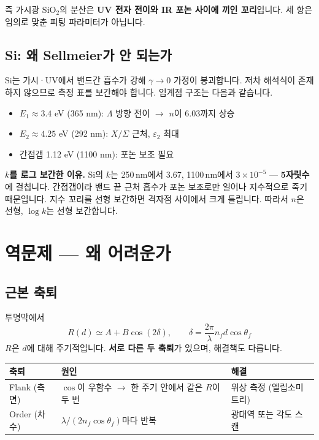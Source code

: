 \documentclass[10pt,a4paper]{article}
\newcommand{\note}[1]{%
  \begin{tcolorbox}[enhanced,breakable,colback=white,colframe=accent,
    boxrule=0pt,leftrule=1.6pt,arc=0pt,outer arc=0pt,
    left=6pt,right=2pt,top=3pt,bottom=3pt,boxsep=0pt,
    before skip=5pt, after skip=8pt]
  #1
  \end{tcolorbox}}
\begin{document}
즉 가시광 SiO$_2$의 분산은 \textbf{UV 전자 전이와 IR 포논 사이에 끼인 꼬리}입니다. 세 항은 임의로 맞춘 피팅 파라미터가 아닙니다.

\subsection{Si: 왜 Sellmeier가 안 되는가}

Si는 가시·UV에서 밴드간 흡수가 강해 $\gamma\to0$ 가정이 붕괴합니다. 저차 해석식이 존재하지 않으므로 측정 표를 보간해야 합니다. 임계점 구조는 다음과 같습니다.

\begin{itemize}[leftmargin=14pt,itemsep=1pt]
\item $E_1\approx3.4$ eV (365 nm): $\Lambda$ 방향 전이 $\to$ $n$이 6.03까지 상승
\item $E_2\approx4.25$ eV (292 nm): $X/\Sigma$ 근처, $\varepsilon_2$ 최대
\item 간접갭 1.12 eV (1100 nm): 포논 보조 필요
\end{itemize}

\note{\textbf{$k$를 로그 보간한 이유.} Si의 $k$는 250\,nm에서 3.67, 1100\,nm에서 $3\times10^{-5}$ — \textbf{5자릿수}에 걸칩니다. 간접갭이라 밴드 끝 근처 흡수가 포논 보조로만 일어나 지수적으로 죽기 때문입니다. 지수 꼬리를 선형 보간하면 격자점 사이에서 크게 틀립니다. 따라서 $n$은 선형, $\log k$는 선형 보간합니다.}

\section{역문제 — 왜 어려운가}

\subsection{근본 축퇴}

투명막에서
\begin{equation}
R(d)\simeq A+B\cos(2\delta),\qquad \delta=\frac{2\pi}{\lambda}n_f d\cos\theta_f
\end{equation}
$R$은 $d$에 대해 주기적입니다. \textbf{서로 다른 두 축퇴}가 있으며, 해결책도 다릅니다.

\begin{center}
\begin{tabular}{@{}lll@{}}
\toprule
축퇴 & 원인 & 해결 \\
\midrule
Flank (측면) & $\cos$이 우함수 $\to$ 한 주기 안에서 같은 $R$이 두 번 & 위상 측정 (엘립소미트리) \\
Order (차수) & $\lambda/(2n_f\cos\theta_f)$마다 반복 & 광대역 또는 각도 스캔 \\
\bottomrule
\end{tabular}
\end{center}
\end{document}

